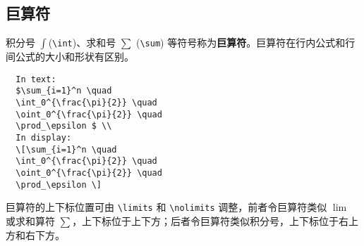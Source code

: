 \subsection{巨算符}
积分号 $\int$(\verb|\int|)、求和号 $\sum$ (\verb|\sum|) 等符号称为\textbf{巨算符}。巨算符在行内公式和行间公式的大小和形状有区别。
\begin{lstlisting}
  In text:
  $\sum_{i=1}^n \quad
  \int_0^{\frac{\pi}{2}} \quad
  \oint_0^{\frac{\pi}{2}} \quad
  \prod_\epsilon $ \\
  In display:
  \[\sum_{i=1}^n \quad
  \int_0^{\frac{\pi}{2}} \quad
  \oint_0^{\frac{\pi}{2}} \quad
  \prod_\epsilon \]
\end{lstlisting}
\begin{center}
\end{center}
巨算符的上下标位置可由 \verb|\limits| 和 \verb|\nolimits| 调整，前者令巨算符类似 $\lim$ 或求和算符 $\sum$，上下标位于上下方；后者令巨算符类似积分号，上下标位于右上方和右下方。


